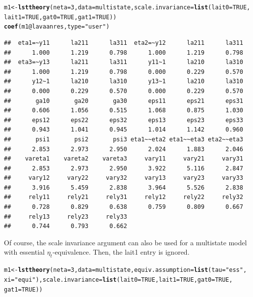 \documentclass[10pt]{article}\usepackage{graphicx, color}
\makeatletter
\newcommand{\hlfunctioncall}[1]{\textcolor[rgb]{0.501960784313725,0,0.329411764705882}{\textbf{#1}}}%
\newcommand{\hlstring}[1]{\textcolor[rgb]{0.6,0.6,1}{#1}}%
\newenvironment{kframe}{%
 \def\at@end@of@kframe{}%
 \ifinner\ifhmode%
  \def\at@end@of@kframe{\end{minipage}}%
  \begin{minipage}{\columnwidth}%
 \fi\fi%
 \def\FrameCommand##1{\hskip\@totalleftmargin \hskip-\fboxsep
 \colorbox{shadecolor}{##1}\hskip-\fboxsep
     \hskip-\linewidth \hskip-\@totalleftmargin \hskip\columnwidth}%
 \MakeFramed {\advance\hsize-\width
   \@totalleftmargin\z@ \linewidth\hsize
   \@setminipage}}%
 {\par\unskip\endMakeFramed%
 \at@end@of@kframe}
\newenvironment{knitrout}{}{} %
\makeatother
\begin{document}
%
\begin{knitrout}
\color{fgcolor}\begin{kframe}
\begin{alltt}
m1 <- \hlfunctioncall{lsttheory}(neta = 3, data = multistate, scale.invariance = \hlfunctioncall{list}(lait0 = TRUE, 
    lait1 = TRUE, gat0 = TRUE, gat1 = TRUE))
\hlfunctioncall{coef}(m1@lavaanres, type = \hlstring{"user"})
\end{alltt}
\begin{verbatim}
##  eta1=~y11      la211      la311  eta2=~y12      la211      la311 
##      1.000      1.219      0.798      1.000      1.219      0.798 
##  eta3=~y13      la211      la311      y11~1      la210      la310 
##      1.000      1.219      0.798      0.000      0.229      0.570 
##      y12~1      la210      la310      y13~1      la210      la310 
##      0.000      0.229      0.570      0.000      0.229      0.570 
##       ga10       ga20       ga30      eps11      eps21      eps31 
##      0.606      1.056      0.515      1.068      0.875      1.030 
##      eps12      eps22      eps32      eps13      eps23      eps33 
##      0.943      1.041      0.945      1.014      1.142      0.960 
##       psi1       psi2       psi3 eta1~~eta2 eta1~~eta3 eta2~~eta3 
##      2.853      2.973      2.950      2.024      1.883      2.046 
##    vareta1    vareta2    vareta3     vary11     vary21     vary31 
##      2.853      2.973      2.950      3.922      5.116      2.847 
##     vary12     vary22     vary32     vary13     vary23     vary33 
##      3.916      5.459      2.838      3.964      5.526      2.838 
##     rely11     rely21     rely31     rely12     rely22     rely32 
##      0.728      0.829      0.638      0.759      0.809      0.667 
##     rely13     rely23     rely33 
##      0.744      0.793      0.662
\end{verbatim}
\end{kframe}
\end{knitrout}

%
Of course, the scale invariance argument can also be used for a multistate model with essential $\eta_t$-equivalence. Then, the lait1 entry is ignored.
%
\begin{knitrout}
\color{fgcolor}\begin{kframe}
\begin{alltt}
m1 <- \hlfunctioncall{lsttheory}(neta = 3, data = multistate, equiv.assumption = \hlfunctioncall{list}(tau = \hlstring{"ess"}, 
    xi = \hlstring{"equi"}), scale.invariance = \hlfunctioncall{list}(lait0 = TRUE, lait1 = TRUE, gat0 = TRUE, 
    gat1 = TRUE))
\end{alltt}
\end{kframe}
\end{knitrout}
\end{document}
